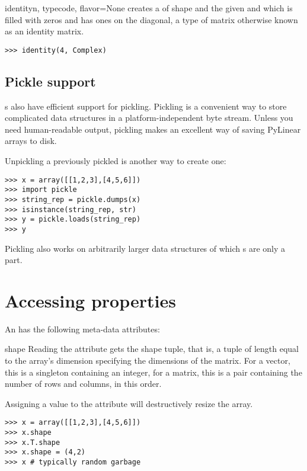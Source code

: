 \begin{funcdesc}{identity}{n, typecode, flavor=None}
   creates a  of shape  and
  the given  and  which is filled with
  zeros and has ones on the diagonal, a type of matrix otherwise
  known as an identity matrix.
\begin{verbatim}
>>> identity(4, Complex)
\end{verbatim}
\end{funcdesc}

\subsection{Pickle support}
s also have efficient support for pickling. Pickling is a
convenient way to store complicated data structures in a platform-independent
byte stream. Unless you need human-readable output, pickling makes an
excellent way of saving PyLinear arrays to disk.

Unpickling a previously pickled  is another way to create one:

\begin{verbatim}
>>> x = array([[1,2,3],[4,5,6]])
>>> import pickle
>>> string_rep = pickle.dumps(x)
>>> isinstance(string_rep, str)
>>> y = pickle.loads(string_rep)
>>> y
\end{verbatim}

Pickling also works on arbitrarily larger data structures of which
s are only a part.

\section{Accessing  properties}

\label{sec:arrayproperties}
An  has the following meta-data attributes:

\begin{memberdesc}[Array]{shape}
  Reading the  attribute gets the shape tuple, that is,
  a tuple of length equal to the array's dimension specifying the
  dimensions of the matrix.  For a vector, this is a singleton
  containing an integer, for a matrix, this is a pair containing the
  number of rows and columns, in this order.  

  Assigning a value to the  attribute will destructively
  resize the array.

\begin{verbatim}
>>> x = array([[1,2,3],[4,5,6]])
>>> x.shape
>>> x.T.shape
>>> x.shape = (4,2)
>>> x # typically random garbage
\end{verbatim}
\end{memberdesc}

